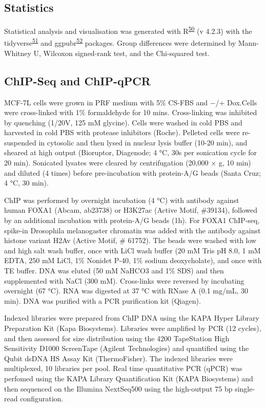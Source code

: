 \documentclass[
  12pt,
]{article}
\begin{document}
\hypertarget{statistics}{%
\subsection{Statistics}\label{statistics}}

Statistical analysis and visualisation was generated with R\textsuperscript{\protect\hyperlink{ref-r}{50}} (v 4.2.3) with the tidyverse\textsuperscript{\protect\hyperlink{ref-wickham2019}{51}} and ggpubr\textsuperscript{\protect\hyperlink{ref-ggpubr}{52}} packages.
Group differences were determined by Mann-Whitney U, Wilcoxon signed-rank test, and the Chi-squared test.

\hypertarget{chip-seq-and-chip-qpcr}{%
\subsection{ChIP-Seq and ChIP-qPCR}\label{chip-seq-and-chip-qpcr}}

MCF-7L cells were grown in PRF medium with 5\% CS-FBS and −/+ Dox.Cells were cross-linked with 1\% formaldehyde for 10 mins.
Cross-linking was inhibited by quenching (1/20V, 125 mM glycine).
Cells were washed in cold PBS and harvested in cold PBS with protease inhibitors (Roche).
Pelleted cells were re-suspended in cytosolic and then lysed in nuclear lysis buffer (10-20 min), and sheared at high output (Bioruptor, Diagenode; 4 °C, 30s per sonication cycle for 20 min).
Sonicated lysates were cleared by centrifugation (20,000 × g, 10 min) and diluted (4 times) before pre-incubation with protein-A/G beads (Santa Cruz; 4 °C, 30 min).

ChIP was performed by overnight incubation (4 °C) with antibody against human FOXA1 (Abcam, ab23738) or H3K27ac (Active Motif, \#39134), followed by an additional incubation with protein-A/G beads (1h).
For FOXA1 ChIP-seq, spike-in Drosophila melanogaster chromatin was added with the antibody against histone variant H2Av (Active Motif, \# 61752).
The beads were washed with low and high salt wash buffer, once with LiCl wash buffer (20 mM Tris pH 8.0, 1 mM EDTA, 250 mM LiCl, 1\% Nonidet P-40, 1\% sodium deoxycholate), and once with TE buffer.
DNA was eluted (50 mM NaHCO3 and 1\% SDS) and then supplemented with NaCl (300 mM).
Cross-links were reversed by incubating overnight (67 °C).
RNA was digested at 37 °C with RNase A (0.1 mg/mL, 30 min).
DNA was purified with a PCR purification kit (Qiagen).

Indexed libraries were prepared from ChIP DNA using the KAPA Hyper Library Preparation Kit (Kapa Biosystems).
Libraries were amplified by PCR (12 cycles), and then assessed for size distribution using the 4200 TapeStation High Sensitivity D1000 ScreenTape (Agilent Technologies) and quantified using the Qubit dsDNA HS Assay Kit (ThermoFisher).
The indexed libraries were multiplexed, 10 libraries per pool.
Real time quantitative PCR (qPCR) was perfomed using the KAPA Library Quantification Kit (KAPA Biosystems) and then sequenced on the Illumina NextSeq500 using the high-output 75 bp single-read configuration.
\end{document}
